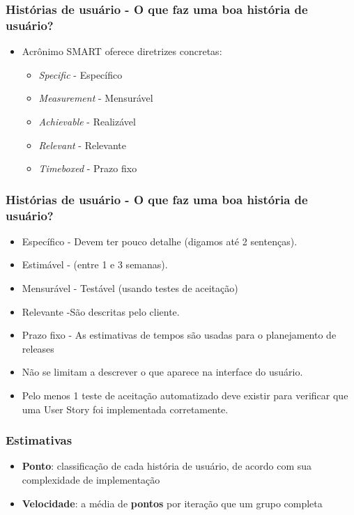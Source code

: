 \begin{frame}
 \frametitle{Histórias de usuário - O que faz uma boa história de usuário?}
 \begin{itemize}
  \item Acrônimo SMART oferece diretrizes concretas: 
  \begin{itemize}
   \item \textit{Specific} - Específico
   \item \textit{Measurement} - Mensurável
   \item \textit{Achievable} - Realizável
   \item \textit{Relevant} - Relevante
   \item \textit{Timeboxed} - Prazo fixo
  \end{itemize}
 \end{itemize}
\end{frame}

\begin{frame}
 \frametitle{Histórias de usuário - O que faz uma boa história de usuário?}
 \begin{itemize}
 \item Específico -  Devem ter pouco detalhe (digamos até 2 sentenças).
  \item Estimável - (entre 1 e 3 semanas).
  \item Mensurável - Testável (usando testes de aceitação)
  \item Relevante -São descritas pelo cliente.
  \item Prazo fixo - As estimativas de tempos são usadas para o planejamento de releases
  \item Não se limitam a descrever o que aparece na interface do usuário.
  \item Pelo menos 1 teste de aceitação automatizado deve existir para verificar que uma User Story foi implementada corretamente.
 \end{itemize}
\end{frame}


\begin{frame}
 \frametitle{Estimativas}
 \begin{itemize}
  \item \textbf{Ponto}: classificação de cada história de usuário, de acordo com sua complexidade de implementação
  \item \textbf{Velocidade}: a média de \textbf{pontos} por iteração que um grupo completa
 \end{itemize}
\end{frame}


